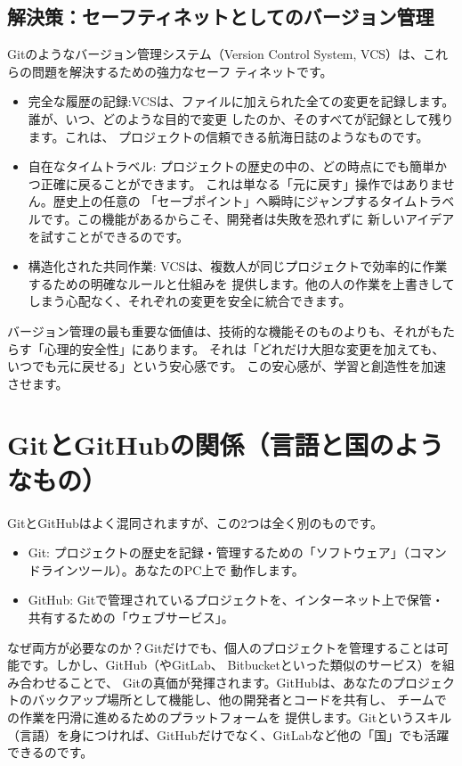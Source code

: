 \documentclass{ltjsarticle}
\begin{document}
\subsection{解決策：セーフティネットとしてのバージョン管理}
Gitのようなバージョン管理システム（Version Control System, VCS）は、これらの問題を解決するための強力なセーフ
ティネットです。
\begin{itemize}
    \item 完全な履歴の記録:VCSは、ファイルに加えられた全ての変更を記録します。誰が、いつ、どのような目的で変更
		したのか、そのすべてが記録として残ります。これは、
    プロジェクトの信頼できる航海日誌のようなものです。
    \item 自在なタイムトラベル: プロジェクトの歴史の中の、どの時点にでも簡単かつ正確に戻ることができます。
		これは単なる「元に戻す」操作ではありません。歴史上の任意の
    「セーブポイント」へ瞬時にジャンプするタイムトラベルです。この機能があるからこそ、開発者は失敗を恐れずに
		新しいアイデアを試すことができるのです。
    \item 構造化された共同作業: VCSは、複数人が同じプロジェクトで効率的に作業するための明確なルールと仕組みを
		提供します。他の人の作業を上書きしてしまう心配なく、それぞれの変更を安全に統合できます。
\end{itemize}
バージョン管理の最も重要な価値は、技術的な機能そのものよりも、それがもたらす「心理的安全性」にあります。
それは「どれだけ大胆な変更を加えても、いつでも元に戻せる」という安心感です。
この安心感が、学習と創造性を加速させます。

\section{GitとGitHubの関係（言語と国のようなもの）}
GitとGitHubはよく混同されますが、この2つは全く別のものです。
\begin{itemize}
    \item Git: プロジェクトの歴史を記録・管理するための「ソフトウェア」（コマンドラインツール）。あなたのPC上で
		動作します。
    \item GitHub: Gitで管理されているプロジェクトを、インターネット上で保管・共有するための「ウェブサービス」。
\end{itemize}
なぜ両方が必要なのか？Gitだけでも、個人のプロジェクトを管理することは可能です。しかし、GitHub（やGitLab、
Bitbucketといった類似のサービス）を組み合わせることで、
Gitの真価が発揮されます。GitHubは、あなたのプロジェクトのバックアップ場所として機能し、他の開発者とコードを共有し、
チームでの作業を円滑に進めるためのプラットフォームを
提供します。Gitというスキル（言語）を身につければ、GitHubだけでなく、GitLabなど他の「国」でも活躍できるのです。
\end{document}
